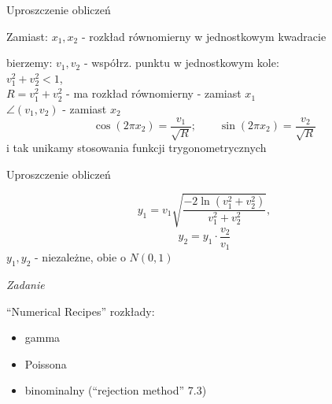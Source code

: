 \begin{frame}{Uproszczenie obliczeń}
	\begin{block}{Zamiast:}
		$x_{1}, x_{2}$ - rozkład równomierny w jednostkowym kwadracie
	\end{block}

	\begin{block}{bierzemy:}
		$v_{1}, v_{2}$ - współrz. punktu w jednostkowym kole:\\
		$v_{1}^{2} + v_{2}^{2} < 1$,\\
		$R = v_{1}^{2} + v_{2}^{2}$ - ma rozkład równomierny - zamiast $x_{1}$\\
		$\angle(v_{1}, v_{2})$ - zamiast $x_{2}$
		\[
			\cos(2\pi x_{2}) = \frac{v_{1}}{\sqrt{R}}; \qquad \sin(2\pi x_{2}) = \frac{v_{2}}{\sqrt{R}}
		\]
		i tak unikamy stosowania funkcji trygonometrycznych
	\end{block}
\end{frame}
\begin{frame}{Uproszczenie obliczeń}
	\begin{block}{}
		\[
			y_{1} = v_{1}\sqrt{\frac{-2 \ln(v_{1}^{2} + v_{2}^{2})}{v_{1}^{2} + v_{2}^{2}}},
		\]
		\[
			y_{2} = y_{1} \cdot \frac{v_{2}}{v_{1}}
		\]
		$y_{1}, y_{2}$ - niezależne, obie o $N(0,1)$
	\end{block}

	\vspace{0.5cm}
	\begin{flushright}
		\textit{Zadanie}
	\end{flushright}

	\vspace{-0.5cm}
	``Numerical Recipes'' rozkłady:
	\begin{itemize}
		\item gamma
		\item Poissona
		\item binominalny (``rejection method'' 7.3)
	\end{itemize}
\end{frame}